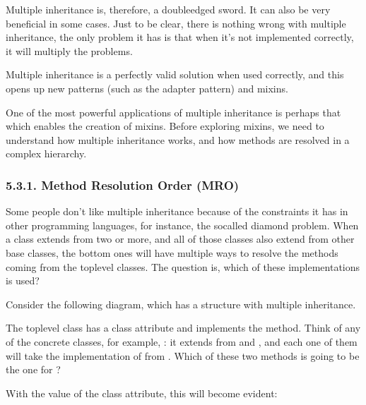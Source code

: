 \documentclass[a4paper,10pt,english]{sphinxmanual}
\begin{document}
Multiple inheritance is, therefore, a double\sphinxhyphen{}edged sword. It can also be very beneficial in some cases. Just
to be clear, there is nothing wrong with multiple inheritance, the only problem it has is that when it’s not
implemented correctly, it will multiply the problems.

Multiple inheritance is a perfectly valid solution when used correctly, and this opens up new patterns
(such as the adapter pattern) and mixins.

One of the most powerful applications of multiple inheritance is perhaps that which enables the creation of
mixins. Before exploring mixins, we need to understand how multiple inheritance works, and how methods are
resolved in a complex hierarchy.


\subsubsection{5.3.1. Method Resolution Order (MRO)}
\label{\detokenize{chapters/3_general_traits/index:method-resolution-order-mro}}
Some people don’t like multiple inheritance because of the constraints it has in other programming languages,
for instance, the so\sphinxhyphen{}called diamond problem. When a class extends from two or more, and all of those classes
also extend from other base classes, the bottom ones will have multiple ways to resolve the methods coming
from the top\sphinxhyphen{}level classes. The question is, which of these implementations is used?

Consider the following diagram, which has a structure with multiple inheritance.

\begin{figure}[H]
\centering

\noindent{}
\end{figure}

The top\sphinxhyphen{}level class has a class attribute and implements the  method. Think of any of the concrete
classes, for example, : it extends from  and , and each one
of them will take the implementation of  from . Which of these two methods is going
to be the one for ?

With the value of the class attribute, this will become evident:
\end{document}
